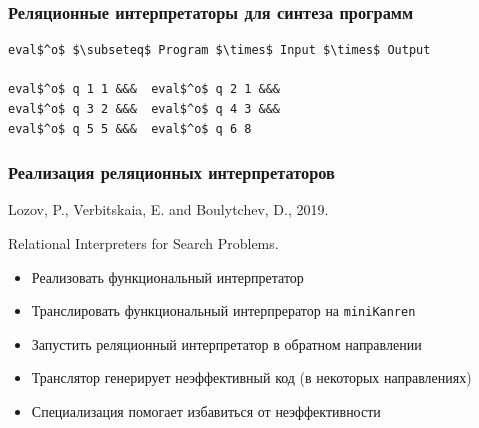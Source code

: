 \documentclass{beamer}
\newcommand{\miniKanren}{\texttt{miniKanren}}
\begin{document}
\begin{frame}[fragile]
  \transwipe[direction=90]
  \frametitle{Реляционные интерпретаторы для синтеза программ}

  \begin{center}
    \begin{minipage}{6.2cm}
    \begin{lstlisting}[frame=single]  
eval$^o$ $\subseteq$ Program $\times$ Input $\times$ Output 

eval$^o$ q 1 1 &&&  eval$^o$ q 2 1 &&& 
eval$^o$ q 3 2 &&&  eval$^o$ q 4 3 &&& 
eval$^o$ q 5 5 &&&  eval$^o$ q 6 8
    \end{lstlisting}
    \end{minipage}
    \end{center}
\end{frame}


\begin{frame}[fragile]
  \transwipe[direction=90]
  \frametitle{Реализация реляционных 
  интерпретаторов} 

\begin{center}    
    Lozov, P., Verbitskaia, E. and Boulytchev, D., 2019.
    
    Relational Interpreters for Search Problems. 
\end{center}

\vfill 

  \begin{itemize}
    \item Реализовать функциональный интерпретатор
    \item Транслировать функциональный интерпрератор на \miniKanren
    \item Запустить реляционный интерпретатор в обратном направлении 
  \end{itemize}

  \vfill

  \begin{itemize}
    \item Транслятор генерирует неэффективный код (в некоторых направлениях) 
    \item Специализация помогает избавиться от неэффективности
  \end{itemize}

\end{frame}
\end{document}
